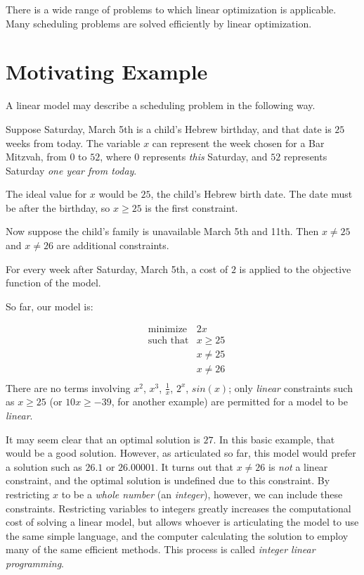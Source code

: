 \documentclass[11pt]{article}
\begin{document}
There is a wide range of problems to which linear optimization is applicable. Many scheduling problems are solved efficiently by linear optimization.

\section{Motivating Example}

A linear model may describe a scheduling problem in the following way.

Suppose Saturday, March 5th is a child's Hebrew birthday, and that date is $25$ weeks from today. The variable $x$ can represent the week chosen for a Bar Mitzvah, from $0$ to $52$, where $0$ represents \emph{this} Saturday, and $52$ represents Saturday \emph{one year from today}.

The ideal value for $x$ would be $25$, the child's Hebrew birth date. The date must be after the birthday, so $x\ge25$ is the first constraint.

Now suppose the child's family is unavailable March 5th and 11th. Then $x \ne 25$ and $x \ne 26$ are additional constraints.

For every week after Saturday, March 5th, a cost of $2$ is applied to the objective function of the model.

So far, our model is:

\begin{align*}
&\text{minimize} &2x\\
&\text{such that} & x \ge 25\\
&& x\ne 25\\
&& x\ne 26\\
\end{align*}
There are no terms involving $x^2$, $x^3$, $\frac{1}{x}$, $2^x$, $sin(x)$; only \emph{linear} constraints such as $x\ge 25$ (or $10x \ge -39$, for another example) are permitted for a model to be \emph{linear}.


It may seem clear that an optimal solution is $27$. In this basic example, that would be a good solution. However, as articulated so far, this model would prefer a solution such as $26.1$ or $26.00001$. It turns out that $x \ne 26$ is \emph{not} a linear constraint, and the optimal solution is undefined due to this constraint. By restricting $x$ to be a \emph{whole number} (an \emph{integer}), however, we can include these constraints. Restricting variables to integers greatly increases the computational cost of solving a linear model, but allows whoever is articulating the model to use the same simple language, and the computer calculating the solution to employ many of the same efficient methods. This process is called \emph{integer linear programming}.
\end{document}
